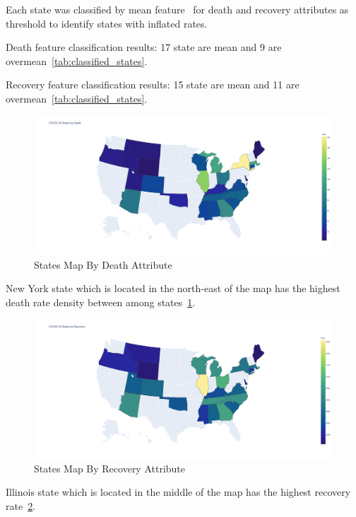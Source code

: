 Each state was classified by mean feature~\cite{wiki-mean} for death and recovery attributes as threshold to identify states with inflated rates.

Death feature classification results: 17 state are mean and 9 are overmean~\ref{tab:classified_states}.

Recovery feature classification results: 15 state are mean and 11 are overmean~\ref{tab:classified_states}.

\begin{figure}[h]
    \includegraphics*[width=\linewidth, keepaspectratio]{../src/output/states_death.png}
    \caption{States Map By Death Attribute}
    \label{fig:states_death}
\end{figure}

New York state which is located in the north-east of the map has the highest death rate density between among states~\ref{fig:states_death}.

\begin{figure}[h]
    \includegraphics*[width=\linewidth, keepaspectratio]{../src/output/states_recovery.png}
    \caption{States Map By Recovery Attribute}
    \label{fig:states_recovery}
\end{figure}

Illinois state which is located in the middle of the map has the highest recovery rate~\ref{fig:states_recovery}.




